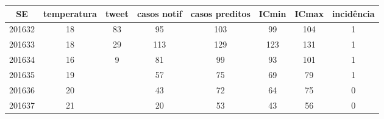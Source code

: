 \begin{tabular}{c|ccccccc}
  \hline
SE & temperatura & tweet & casos notif & casos preditos & ICmin & ICmax & incidência \\ 
  \hline
201632 & 18 & 83 & 95 & 103 & 99 & 104 & 1 \\ 
  201633 & 18 & 29 & 113 & 129 & 123 & 131 & 1 \\ 
  201634 & 16 & 9 & 81 & 99 & 93 & 101 & 1 \\ 
  201635 & 19 &  & 57 & 75 & 69 & 79 & 1 \\ 
  201636 & 20 &  & 43 & 72 & 64 & 75 & 0 \\ 
  201637 & 21 &  & 20 & 53 & 43 & 56 & 0 \\ 
   \hline
\end{tabular}
